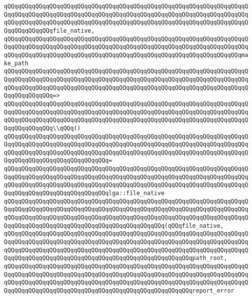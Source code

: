 \verb|qQQqqQQqqQQqqQQqqQQqqQQqqQQqqQQqqQQqqQQqqQQqqQQqqQQqqQQqqQQqqQQqqQQqqQQqqQQqqQQqqQQqqQQqqQQqqQQqqQQqqQQqqQQqqQQqqQQqqQQqqQQqqQQqqQQqqQQqqQQqqQQqqQQqqQQqqQQqqQQqqQQqqQQqqQQqqQQqqQQqqQQqqQQqqQQqqQQqqQQqqQQqqQQqqQQqqQQqqQQqqQQqfile_native,|\newline
\newline
\verb|qQQqqQQqqQQqqQQqqQQqqQQqqQQqqQQqqQQqqQQqqQQqqQQqqQQqqQQqqQQqqQQqqQQqqQQqqQQqqQQqqQQqqQQqqQQqqQQqqQQqqQQqqQQqqQQqqQQqqQQqqQQqqQQqqQQqqQQqqQQqqQQqqQQqqQQqqQQqqQQqqQQqqQQqqQQqqQQqqQQqqQQqqQQqqQQqqQQqqQQqqQQqqQQqmake_path|\newline
\verb|qQQqqQQqqQQqqQQqqQQqqQQqqQQqqQQqqQQqqQQqqQQqqQQqqQQqqQQqqQQqqQQqqQQqqQQqqQQqqQQqqQQqqQQqqQQqqQQqqQQqqQQqqQQqqQQqqQQqqQQqqQQqqQQqqQQqqQQqqQQqqQQqqQQqqQQqqQQqqQQqqQQqqQQqqQQqqQQqqQQqqQQqqQQqqQQqqQQqqQQqqQQqqQQqqQQqqQQqqQQqqQQq=>|\newline
\verb|qQQqqQQqqQQqqQQqqQQqqQQqqQQqqQQqqQQqqQQqqQQqqQQqqQQqqQQqqQQqqQQqqQQqqQQqqQQqqQQqqQQqqQQqqQQqqQQqqQQqqQQqqQQqqQQqqQQqqQQqqQQqqQQqqQQqqQQqqQQqqQQqqQQqqQQqqQQqqQQqqQQqqQQqqQQqqQQqqQQqqQQqqQQqqQQqqQQqqQQqqQQqqQQqqQQqqQQqqQQqqQQq\\qQQq()|\newline
\verb|qQQqqQQqqQQqqQQqqQQqqQQqqQQqqQQqqQQqqQQqqQQqqQQqqQQqqQQqqQQqqQQqqQQqqQQqqQQqqQQqqQQqqQQqqQQqqQQqqQQqqQQqqQQqqQQqqQQqqQQqqQQqqQQqqQQqqQQqqQQqqQQqqQQqqQQqqQQqqQQqqQQqqQQqqQQqqQQqqQQqqQQqqQQqqQQqqQQqqQQqqQQqqQQqqQQqqQQqqQQqqQQqqQQqqQQqqQQqqQQq=|\newline
\verb|qQQqqQQqqQQqqQQqqQQqqQQqqQQqqQQqqQQqqQQqqQQqqQQqqQQqqQQqqQQqqQQqqQQqqQQqqQQqqQQqqQQqqQQqqQQqqQQqqQQqqQQqqQQqqQQqqQQqqQQqqQQqqQQqqQQqqQQqqQQqqQQqqQQqqQQqqQQqqQQqqQQqqQQqqQQqqQQqqQQqqQQqqQQqqQQqqQQqqQQqqQQqqQQqqQQqqQQqqQQqqQQqqQQqqQQqqQQqqQQqlga::file_native|\newline
\verb|qQQqqQQqqQQqqQQqqQQqqQQqqQQqqQQqqQQqqQQqqQQqqQQqqQQqqQQqqQQqqQQqqQQqqQQqqQQqqQQqqQQqqQQqqQQqqQQqqQQqqQQqqQQqqQQqqQQqqQQqqQQqqQQqqQQqqQQqqQQqqQQqqQQqqQQqqQQqqQQqqQQqqQQqqQQqqQQqqQQqqQQqqQQqqQQqqQQqqQQqqQQqqQQqqQQqqQQqqQQqqQQqqQQqqQQqqQQqqQQqqQQqqQQqqQQqqQQq(qQQqfile_native,|\newline
\verb|qQQqqQQqqQQqqQQqqQQqqQQqqQQqqQQqqQQqqQQqqQQqqQQqqQQqqQQqqQQqqQQqqQQqqQQqqQQqqQQqqQQqqQQqqQQqqQQqqQQqqQQqqQQqqQQqqQQqqQQqqQQqqQQqqQQqqQQqqQQqqQQqqQQqqQQqqQQqqQQqqQQqqQQqqQQqqQQqqQQqqQQqqQQqqQQqqQQqqQQqqQQqqQQqqQQqqQQqqQQqqQQqqQQqqQQqqQQqqQQqqQQqqQQqqQQqqQQqqQQqqQQqpath_root,|\newline
\verb|qQQqqQQqqQQqqQQqqQQqqQQqqQQqqQQqqQQqqQQqqQQqqQQqqQQqqQQqqQQqqQQqqQQqqQQqqQQqqQQqqQQqqQQqqQQqqQQqqQQqqQQqqQQqqQQqqQQqqQQqqQQqqQQqqQQqqQQqqQQqqQQqqQQqqQQqqQQqqQQqqQQqqQQqqQQqqQQqqQQqqQQqqQQqqQQqqQQqqQQqqQQqqQQqqQQqqQQqqQQqqQQqqQQqqQQqqQQqqQQqqQQqqQQqqQQqqQQqqQQqqQQqreport_error|\newline
